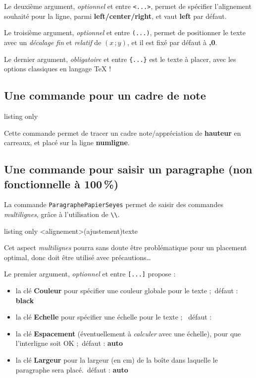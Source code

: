 \documentclass[a4paper]{article}
\newcommand\Cle[1]{{\bfseries\sffamily\textlangle #1\textrangle}}
\begin{document}
Le deuxième argument, \textit{optionnel} et entre \texttt{<...>}, permet de spécifier l'alignement souhaité pour la ligne, parmi \Cle{left/center/right}, et vaut \Cle{left} par défaut.

\smallskip

Le troisième argument, \textit{optionnel} et entre \texttt{(...)}, permet de positionner le texte avec un \textit{décalage fin} et \textit{relatif} de $(x\,;y)$, et il est fixé par défaut à \Cle{0,0}.

\smallskip

Le dernier argument, \textit{obligatoire} et entre \texttt{\{...\}} est le texte à placer, avec les options classiques en langage \TeX{} !

\subsection{Une commande pour un cadre de note}

\begin{PresentationCode}{listing only}
\end{PresentationCode}

Cette commande permet de tracer un cadre \textsf{note/appréciation} de \Cle{hauteur} en carreaux, et placé sur la ligne \Cle{numligne}.

\pagebreak

\subsection{Une commande pour saisir un paragraphe (non fonctionnelle à 100\,\%)}

La commande \texttt{ParagraphePapierSeyes} permet de saisir des commandes \textit{multilignes}, grâce à l'utilisation de \texttt{\textbackslash\textbackslash}.

\begin{PresentationCode}{listing only}
\ParagraphePapierSeyes[options]<alignement>(ajustement){texte}
\end{PresentationCode}

\faBomb{} Cet aspect \textit{multilignes} pourra sans doute être problématique pour un placement optimal, donc doit être utilisé avec précautions\ldots

\smallskip

Le premier argument, \textit{optionnel} et entre \texttt{[...]} propose :

\begin{itemize}
	\item la clé \Cle{Couleur} pour spécifier une couleur globale pour le texte ;\hfill~défaut : \Cle{black}
	\item la clé \Cle{Echelle} pour spécifier une échelle pour le texte ; \hfill~défaut : \Cle{1}
	\item la clé \Cle{Espacement} (éventuellement à \textit{calculer} avec une échelle), pour que l'interligne soit OK ;\hfill~défaut : \Cle{auto}
	\item la clé \Cle{Largeur} pour la largeur (en cm) de la boîte dans laquelle le paragraphe sera placé.\hfill~défaut : \Cle{auto}
\end{itemize}
\end{document}
